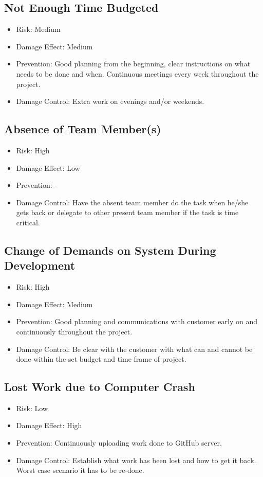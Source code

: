 \documentclass[a4paper]{article}
\begin{document}
\subsection{Not Enough Time Budgeted}
\begin{itemize}
\item Risk: Medium 
\item Damage Effect: Medium
\item Prevention: Good planning from the beginning, clear instructions on what needs to be done and when. Continuous meetings every week throughout the project.
\item Damage Control: Extra work on evenings and/or weekends.
\end{itemize}

\subsection{Absence of Team Member(s)}
\begin{itemize}
\item Risk: High
\item Damage Effect: Low
\item Prevention: -
\item Damage Control: Have the absent team member do the task when he/she gets back or delegate to other present team member if the task is time critical.
\end{itemize}

\subsection{Change of Demands on System During Development}
\begin{itemize}
\item Risk: High
\item Damage Effect: Medium
\item Prevention: Good planning and communications with customer early on and continuously throughout the project.
\item Damage Control: Be clear with the customer with what can and cannot be done within the set budget and time frame of project.
\end{itemize}

\subsection{Lost Work due to Computer Crash}
\begin{itemize}
\item Risk: Low
\item Damage Effect: High
\item Prevention: Continuously uploading work done to GitHub server.
\item Damage Control: Establish what work has been lost and how to get it back. Worst case scenario it has to be re-done.
\end{itemize}
\end{document}
